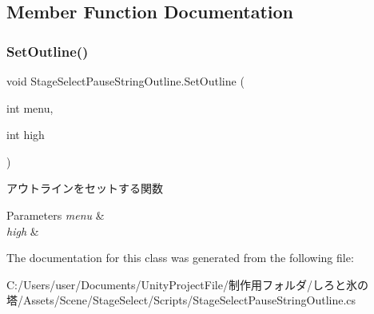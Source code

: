 \subsection{Member Function Documentation}
\mbox{\label{class_stage_select_pause_string_outline_a575ce9364ec9f4bdd5a297aeaaa2182d}} 
\subsubsection{\texorpdfstring{Set\+Outline()}{SetOutline()}}
{\footnotesize\ttfamily void Stage\+Select\+Pause\+String\+Outline.\+Set\+Outline (\begin{DoxyParamCaption}\item[{int}]{menu,  }\item[{int}]{high }\end{DoxyParamCaption})\hspace{0.3cm}{\ttfamily [inline]}}



アウトラインをセットする関数 


\begin{DoxyParams}{Parameters}
{\em menu} & \\
\hline
{\em high} & \\
\hline
\end{DoxyParams}


The documentation for this class was generated from the following file\+:\begin{DoxyCompactItemize}
\item 
C\+:/\+Users/user/\+Documents/\+Unity\+Project\+File/制作用フォルダ/しろと氷の塔/\+Assets/\+Scene/\+Stage\+Select/\+Scripts/Stage\+Select\+Pause\+String\+Outline.\+cs\end{DoxyCompactItemize}
